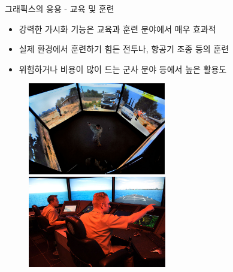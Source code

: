 \documentclass{beamer}
\begin{document}
\begin{frame}{그래픽스의 응용 - 교육 및 훈련}

\begin{itemize}
\item 강력한 가시화 기능은 교육과 훈련 분야에서 매우 효과적
\item 실제 환경에서 훈련하기 힘든 전투나, 항공기 조종 등의 훈련
\item 위험하거나 비용이 많이 드는 군사 분야 등에서 높은 활용도
\end{itemize}

\begin{figure}[h!]
  \centering
    \includegraphics[height=4cm]{OGL_intro/virtualTraining.jpg}
    \includegraphics[height=4cm]{OGL_intro/virtualTraining2.jpg}
\end{figure}

\end{frame}
\end{document}
